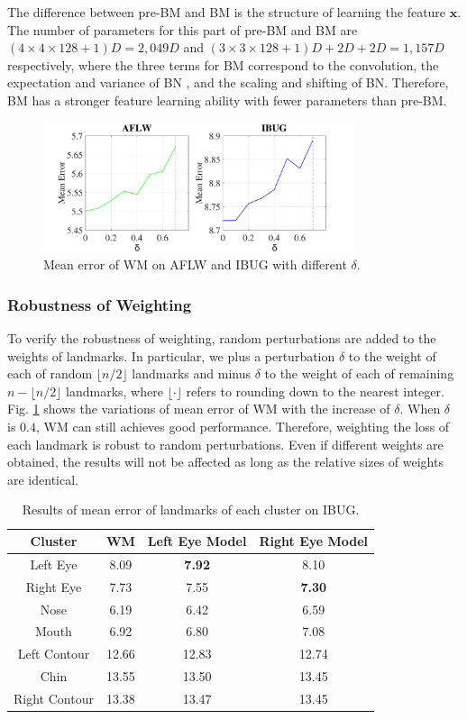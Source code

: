\documentclass[journal]{IEEEtran}
\begin{document}
The difference between pre-BM and BM is the structure of learning the feature $\mathbf{x}$. The number of parameters for this part of pre-BM and BM are $(4\times4\times128+1)D=2,049D$ and $(3\times3\times128+1)D+2D+2D=1,157D$ respectively, where the three terms for BM correspond to the convolution, the expectation and variance of BN \cite{ioffe2015batch}, and the scaling and shifting of BN. Therefore, BM has a stronger feature learning ability with fewer parameters than pre-BM.

\begin{figure}[!htb]
  \centering
  \includegraphics[width=3.6in]{weight_perturb}
  \caption{Mean error of WM on AFLW and IBUG with different $\delta$.}
  \label{fig:weight_perturb} %
\end{figure}

\subsubsection{Robustness of Weighting}

To verify the robustness of weighting, random perturbations are added to the weights of landmarks. In particular, we plus a perturbation $\delta$ to the weight of each of random $\lfloor n/2 \rfloor$ landmarks and minus $\delta$ to the weight of each of remaining $n-\lfloor n/2 \rfloor$ landmarks, where $\lfloor \cdot \rfloor$ refers to rounding down to the nearest integer. Fig. \ref{fig:weight_perturb} shows the variations of mean error of WM with the increase of $\delta$. When $\delta$ is $0.4$, WM can still achieves good performance. Therefore, weighting the loss of each landmark is robust to random perturbations. Even if different weights are obtained, the results will not be affected as long as the relative sizes of weights are identical.

\begin{table}[!htb]
\centering\caption{Results of mean error of landmarks of each cluster on IBUG.}
\label{tab:central_model}
\begin{tabular}{|*{4}{c|}}
\hline
Cluster&WM &Left Eye Model &Right Eye Model\\
\hline
Left Eye&8.09&\textbf{7.92}&8.10\\
Right Eye&7.73&7.55&\textbf{7.30}\\
Nose&6.19&6.42&6.59\\
Mouth&6.92&6.80&7.08\\
Left Contour&12.66&12.83&12.74\\
Chin&13.55&13.50&13.45\\
Right Contour&13.38&13.47&13.45\\
\hline
\end{tabular}
\end{table}
\end{document}
